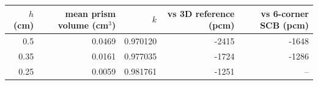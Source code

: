 \begin{tabular}{rrrrr}
\hline
$h$ (cm) & mean prism volume (cm$^3$) & $k$ & vs 3D reference (pcm) & vs 6-corner SCB (pcm)\\
\hline
0.5 & 0.0469 & 0.970120 & -2415 & -1648\\
0.35 & 0.0161 & 0.977035 & -1724 & -1286\\
0.25 & 0.0059 & 0.981761 & -1251 & --\\
\hline
\end{tabular}
